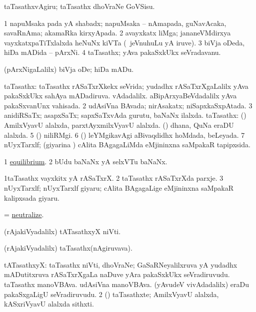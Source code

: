 \noindent
\gl{\pagu}
\bmng
{} taTasathxvAgiru; taTasathx dhoVraNe GoVSisu. 
\emng
\eentry

\bentry
{}
\gl{\nA}
\bmng
\bnum
\num{1} napuMsaka pada yA shabadx; napuMsaka -- nAmapada, guNavAcaka, savaRnAma; akamaRka kirxyApada. 
\num{2} avayxkatx liMga; jananeVMdirxya vayxkatxpaTiTxlalxda heNuNx kiVTa (\kanmu\ jeVnuhuLu yA iruve). 
\num{3} biVja oDeda, hiDa mADida -- pArxNi. 
\num{4} taTasathx; yAva pakaSxkUkx seVradavanu. 
\enum
\emng
\eentry

\bentry
{}
\gl{\sakirx}
\bmng
(pArxNigaLalilx) biVja oDe; hiDa mADu. 
\emng
\eentry

\bentry
{}
\gl{\gu}
\bmng
\bnum
{} taTasathx: 
\banum
{} taTasathx rASaTxrXkekx seVrida; yudadhx rASaTxrXgaLalilx yAva pakaSxkUkx sahAya mADadiruva. 
 vAdadalilx. aBipArxyaBeVdadalilx yAva pakaSxvanUnx vahisada. 
\eanum
\numie
\num{2} udAsiVna BAvada; nirAsakatx; niSapxkaSxpAtada. 
\num{3} anidiRSaTx; asapxSaTx; sapxSaTxvAda gurutu, baNaNx ilalxda. 
 taTasathx: 
\banum
{} (\ravi) AmilxVyavU alalxda, parxtAyxmilxVyavU alalxda. 
 (\viduyx) dhana, QuNa eraDU alalxda. 
\eanum
\numie
\num{5} (\savi) niliRMgi. 
\num{6} (\kiVvi) leYMgikavAgi aBivaqdidhx hoMdada, beLeyada. 
\num{7} nUyxTarxlf; (giyarina \vi) cAlita BAgagaLiMda eMjininxna saMpakaR tapipxsida. 
\enum
\emng

\noindent
\gl{\pagu}
\bmng
\bnum
\num{1}  \hyperref{kandict_e.pdf}{E}{equilibrium pagu(1)}{equilibrium}. 
\num{2}  bUdu baNaNx yA selxVTu baNaNx. 
\enum
\emng
\eentry

\bentry
{}
\gl{\nA}
\bmng
\bnum
\num{1}taTasathx vayxkitx yA rASaTxrX. 
\num{2} taTasathx rASaTxrXda parxje. 
\num{3} nUyxTarxlf; nUyxTarxlf giyaru; cAlita BAgagaLige eMjininxna saMpakaR kalipxsada giyaru. 
\enum
\emng
\eentry

\bentry
{}
\gl{\kirx}
\bmng
= \hyperlink{neutralize}{neutralize}. 
\emng
\eentry

\bentry
{}
\gl{\nA}
\bmng
(rAjakiVyadalilx) tATasathxyX niVti. 
\emng
\eentry

\bentry
{}
\gl{\nA}
\bmng
(rAjakiVyadalilx) taTasathx(nAgiruvava). 
\emng
\eentry

\bentry
{}
\gl{\nA}
\bmng
\bnum
{} tATasathxyX: 
\banum
{} taTasathx niVti, dhoVraNe; GaSaRNeyalilxruva yA yudadhx mADutitxruva rASaTxrXgaLa naDuve yAra pakaSxkUkx seVradiruvudu. 
 taTasathx manoVBAva. 
 udAsiVna manoVBAva. 
 (yAvudeV vivAdadalilx) eraDu pakaSxgaLigU seVradiruvudu. 
\eanum
\numie
\num{2} (\ravi) taTasathxte; AmilxVyavU alalxda, kASxriVyavU alalxda sithxti. 
\enum
\emng
\eentry

